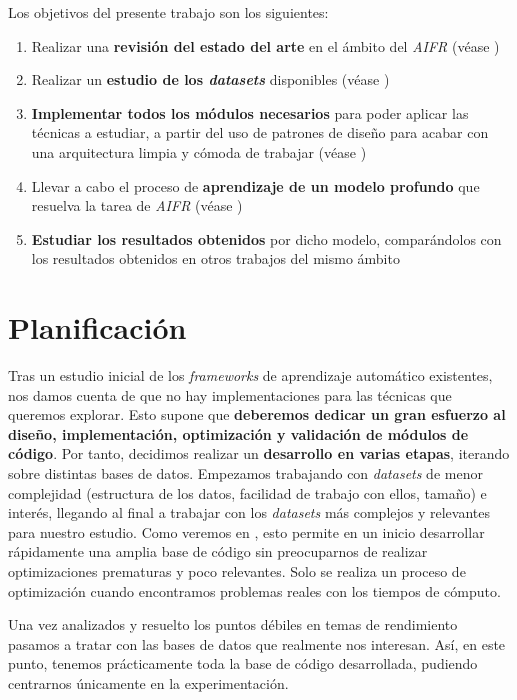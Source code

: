 Los objetivos del presente trabajo son los siguientes:

\begin{enumerate}
    \item Realizar una \textbf{revisión del estado del arte} en el ámbito del \textit{AIFR} (véase )
    \item Realizar un \textbf{estudio de los \textit{datasets}} disponibles (véase )
    \item \textbf{Implementar todos los módulos necesarios} para poder aplicar las técnicas a estudiar, a partir del uso de patrones de diseño para acabar con una arquitectura limpia y cómoda de trabajar (véase )
    \item Llevar a cabo el proceso de \textbf{aprendizaje de un modelo profundo} que resuelva la tarea de \textit{AIFR} (véase )
    \item \textbf{Estudiar los resultados obtenidos} por dicho modelo, comparándolos con los resultados obtenidos en otros trabajos del mismo ámbito
\end{enumerate}

\section{Planificación} \label{isec:planificacion}

Tras un estudio inicial de los \textit{frameworks} de aprendizaje automático existentes, nos damos cuenta de que no hay implementaciones para las técnicas que queremos explorar. Esto supone que \textbf{deberemos dedicar un gran esfuerzo al diseño, implementación, optimización y validación de módulos de código}. Por tanto, decidimos realizar un \textbf{desarrollo en varias etapas}, iterando sobre distintas bases de datos. Empezamos trabajando con \textit{datasets} de menor complejidad (estructura de los datos, facilidad de trabajo con ellos, tamaño) e interés, llegando al final a trabajar con los \textit{datasets} más complejos y relevantes para nuestro estudio. Como veremos en , esto permite en un inicio desarrollar rápidamente una amplia base de código sin preocuparnos de realizar optimizaciones prematuras y poco relevantes. Solo se realiza un proceso de optimización cuando encontramos problemas reales con los tiempos de cómputo.

Una vez analizados y resuelto los puntos débiles en temas de rendimiento pasamos a tratar con las bases de datos que realmente nos interesan. Así, en este punto, tenemos prácticamente toda la base de código desarrollada, pudiendo centrarnos únicamente en la experimentación.


